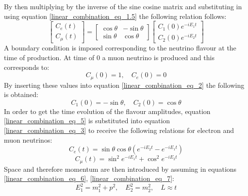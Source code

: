 By then multiplying by the inverse of the sine cosine matrix and substituting in using equation \ref{linear_combination_eq_1.5} the following relation follows:
\begin{equation}
    \begin{bmatrix}
        C_e(t) \\
        C_\mu(t)
    \end{bmatrix}
    =
    \begin{bmatrix}
        \cos\theta & -\sin\theta \\
        \sin\theta & \cos\theta 
    \end{bmatrix}
        \begin{bmatrix}
        C_1(0)e^{-iE_1t} \\
        C_2(0)e^{-iE_2t}
    \end{bmatrix}
    \label{linear_combination_eq_3}
\end{equation}
A boundary condition is imposed corresponding to the neutrino flavour at the time of production. At time of 0 a muon neutrino is produced and this corresponds to:
\begin{equation}
    C_\mu(0) = 1, \quad C_e(0) = 0
    \label{linear_combination_eq_4}
\end{equation}
By inserting these values into equation \ref{linear_combination_eq_2} the following is obtained:
\begin{equation}
    C_1(0) = -\sin\theta, \quad C_2(0) = \cos\theta
    \label{linear_combination_eq_5}
\end{equation}
In order to get the time evolution of the flavour amplitudes, equation \ref{linear_combination_eq_5} is substituted into equation \ref{linear_combination_eq_3} to receive the following relations for electron and muon neutrinos: 
\begin{equation}
    C_e(t)=\sin\theta\cos\theta(e^{-iE_2t}-e^{-iE_1t})
    \label{linear_combination_eq_6}
\end{equation}
\begin{equation}
    C_\mu(t)=\sin^{2}e^{-iE_1t} + \cos^{2}e^{-iE_2t}
    \label{linear_combination_eq_7}
\end{equation}
Space and therefore momentum are then introduced by assuming in equations \ref{linear_combination_eq_6}, \ref{linear_combination_eq_7}: 
\begin{equation}
   E_1^2=m_1^2 + p^2, \quad E_2^2=m_2^2  , \quad L \approx t
    \label{linear_combination_eq_8}
\end{equation}
